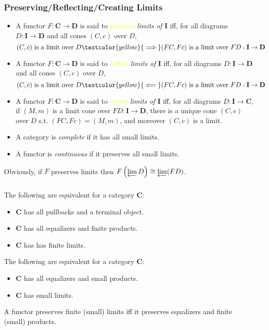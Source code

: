\documentclass[UTF8,11pt,colorlinks,compress,openany]{beamer}%
\begin{document}
\begin{frame}\frametitle{Preserving/Reflecting/Creating Limits}
\begin{itemize}
	\item A functor $F:\mathbf{C}\to\mathbf{D}$ is said to \emph{\textcolor{yellow}{preserve} limits of $\mathbf{I}$} iff, for all diagrams $D:\mathbf{I}\to\mathbf{D}$ and all cones $(C,c)$ over $D$,
	\[(C,c) \mbox{ is a limit over } D\textcolor{yellow}{\implies} (FC,Fc) \mbox{ is a limit over } FD:\mathbf{I}\to\mathbf{D}\]
	\item A functor $F:\mathbf{C}\to\mathbf{D}$ is said to \emph{\textcolor{yellow}{reflect} limits of $\mathbf{I}$} iff, for all diagrams $D:\mathbf{I}\to\mathbf{D}$ and all cones $(C,c)$ over $D$,
	\[(C,c) \mbox{ is a limit over } D\textcolor{yellow}{\impliedby} (FC,Fc) \mbox{ is a limit over } FD:\mathbf{I}\to\mathbf{D}\]
	\item A functor $F:\mathbf{C}\to\mathbf{D}$ is said to \emph{\textcolor{yellow}{create} limits of $\mathbf{I}$} iff, for all diagrams $D:\mathbf{I}\to\mathbf{C}$, if $(M,m)$ is a limit cone over $FD:\mathbf{I}\to\mathbf{D}$, there is a unique cone $(C,c)$ over $D$ s.t. $(FC,Fc)=(M,m)$, and moreover $(C,c)$ is a limit.
	\item A category is \emph{complete} if it has all small limits.
	\item A functor is \emph{continuous} if it preserves all small limits.
\end{itemize}
Obviously, if $F$ preserves limits then $F\left(\varprojlim D\right)\cong\varprojlim (FD)$.
\end{frame}

\begin{frame}\frametitle{}
\begin{theorem}
	The following are equivalent for a category $\mathbf{C}$:
\begin{itemize}
	\item $\mathbf{C}$ has all pullbacks and a terminal object.
	\item $\mathbf{C}$ has all equalizers and finite products.
	\item $\mathbf{C}$ has has finite limits.
\end{itemize}
\end{theorem}
\begin{theorem}
	The following are equivalent for a category $\mathbf{C}$:
\begin{itemize}
	\item $\mathbf{C}$ has all equalizers and small products.
	\item $\mathbf{C}$ has small limits.
\end{itemize}
\end{theorem}
\begin{theorem}
	A functor preserves finite (small) limits iff it preserves equalizers and finite (small) products.
\end{theorem}
\end{frame}
\end{document}
